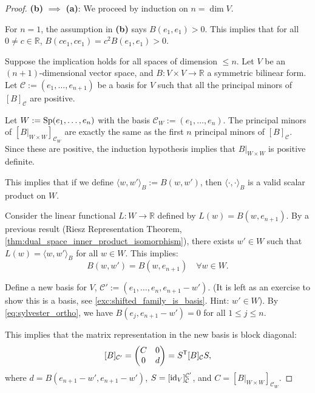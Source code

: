 \begin{proof}
\textbf{(b)} $\implies$ \textbf{(a)}: We proceed by induction on $n = \dim V$.

For $n = 1$, the assumption in \textbf{(b)} says $B(e_1, e_1) > 0$. This implies that for all $0 \neq c \in \mathbb{R}$, $B(c e_1, c e_1) = c^2 B(e_1, e_1) > 0$.

Suppose the implication holds for all spaces of dimension $\le n$. Let $V$ be an $(n+1)$-dimensional vector space, and $B \colon V \times V \to \mathbb{R}$ a symmetric bilinear form. Let $\mathcal{C} := (e_1, \dots, e_{n+1})$ be a basis for $V$ such that all the principal minors of $[B]_{\mathcal{C}}$ are positive.

Let $W := \operatorname{Sp}(e_1, \dots, e_n)$ with the basis $\mathcal{C}_W := (e_1, \dots, e_n)$.
The principal minors of $[B|_{W \times W}]_{\mathcal{C}_W}$ are exactly the same as the first $n$ principal minors of $[B]_{\mathcal{C}}$. Since these are positive, the induction hypothesis implies that $B|_{W \times W}$ is positive definite.

This implies that if we define $\langle w, w' \rangle_B := B(w, w')$, then $\langle \cdot, \cdot \rangle_B$ is a valid scalar product on $W$.

Consider the linear functional $L \colon W \to \mathbb{R}$ defined by $L(w) = B(w, e_{n+1})$.
By a previous result (Riesz Representation Theorem, \cref{thm:dual_space_inner_product_isomorphism}), there exists $w' \in W$ such that $L(w) = \langle w, w' \rangle_B$ for all $w \in W$. This implies:
\begin{equation}
\label{eq:sylvester_ortho}
B(w, w') = B(w, e_{n+1}) \quad \forall w \in W.
\end{equation}

Define a new basis for $V$, $\mathcal{C}' := (e_1, \dots, e_n, e_{n+1} - w')$. (It is left as an exercise to show this is a basis, see \cref{exc:shifted_family_is_basis}. Hint: $w' \in W$).
By \eqref{eq:sylvester_ortho}, we have $B(e_j, e_{n+1} - w') = 0$ for all $1 \le j \le n$. 

This implies that the matrix representation in the new basis is block diagonal:
\[
[B]_{\mathcal{C}'} = \begin{pmatrix} C & 0 \\ 0 & d \end{pmatrix} = S^{\mathsf{T}} [B]_{\mathcal{C}} S,
\]
where $d = B(e_{n+1} - w', e_{n+1} - w')$, $S = [\operatorname{id}_V]_{\mathcal{C}}^{\mathcal{C}'}$, and $C = [B|_{W \times W}]_{\mathcal{C}_W}$.


\end{proof}
